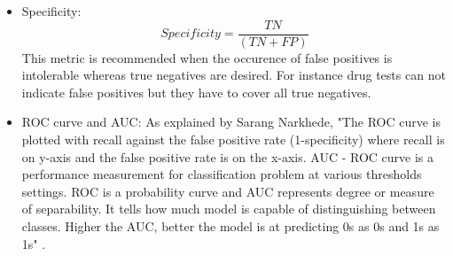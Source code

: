 \begin{itemize}
\item Specificity:
\begin{equation}
Specificity = \frac{TN}{(TN + FP)}
\end{equation}
This metric is recommended when the occurence of false positives is intolerable whereas true negatives are desired. For instance drug tests can not indicate false positives but they have to cover all true negatives.
\item ROC curve and AUC:
As explained by Sarang Narkhede, "The ROC curve is plotted with recall against the false positive rate (1-specificity) where recall is on y-axis and the false positive rate is on the x-axis. AUC - ROC curve is a performance measurement for classification problem at various thresholds settings. ROC is a probability curve and AUC represents degree or measure of separability. It tells how much model is capable of distinguishing between classes. Higher the AUC, better the model is at predicting 0s as 0s and 1s as 1s" \cite{26}.

\end{itemize}




